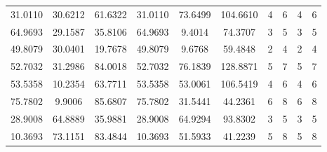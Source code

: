 \documentclass[withoutpreface,bwprint]{cumcmthesis} %
\begin{document}
\begin{appendices}
\begin{table}[htbp!]
\begin{tabular}{@{}cccccccccc@{}}
							31.0110                          & 30.6212                          & 61.6322                          & 31.0110                          & 73.6499                          & 104.6610                         & 4                    & 6                    & 4                      & 6                      \\
							64.9693                          & 29.1587                          & 35.8106                          & 64.9693                          & 9.4014                           & 74.3707                          & 3                    & 5                    & 3                      & 5                      \\
							49.8079                          & 30.0401                          & 19.7678                          & 49.8079                          & 9.6768                           & 59.4848                          & 2                    & 4                    & 2                      & 4                      \\
							52.7032                          & 31.2986                          & 84.0018                          & 52.7032                          & 76.1839                          & 128.8871                         & 5                    & 7                    & 5                      & 7                      \\
							53.5358                          & 10.2354                          & 63.7711                          & 53.5358                          & 53.0061                          & 106.5419                         & 4                    & 6                    & 4                      & 6                      \\
							75.7802                          & 9.9006                           & 85.6807                          & 75.7802                          & 31.5441                          & 44.2361                          & 6                    & 8                    & 6                      & 8                      \\
							28.9008                          & 64.8889                          & 35.9881                          & 28.9008                          & 64.9294                          & 93.8302                          & 3                    & 5                    & 3                      & 5                      \\
							10.3693                          & 73.1151                          & 83.4844                          & 10.3693                          & 51.5933                          & 41.2239                          & 5                    & 8                    & 5                      & 8                      \\

\end{tabular}
\end{table}
\end{appendices}
\end{document}
